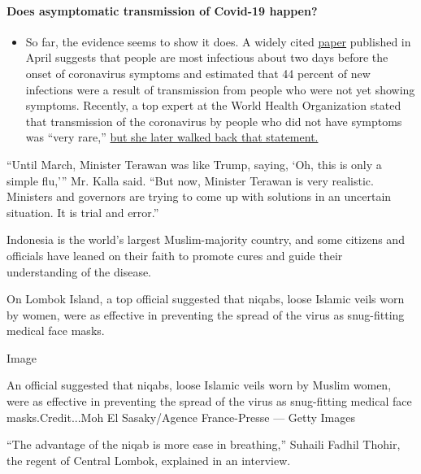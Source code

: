 \begin{itemize}
{  \paragraph{Does asymptomatic transmission of Covid-19
  happen?}\label{does-asymptomatic-transmission-of-covid-19-happen}}

  \begin{itemize}
  \tightlist
  \item
    So far, the evidence seems to show it does. A widely cited
    \href{https://www.nature.com/articles/s41591-020-0869-5}{paper}
    published in April suggests that people are most infectious about
    two days before the onset of coronavirus symptoms and estimated that
    44 percent of new infections were a result of transmission from
    people who were not yet showing symptoms. Recently, a top expert at
    the World Health Organization stated that transmission of the
    coronavirus by people who did not have symptoms was ``very rare,''
    \href{https://www.nytimes3xbfgragh.onion/2020/06/09/world/coronavirus-updates.html?action=click\&pgtype=Article\&state=default\&region=MAIN_CONTENT_3\&context=storylines_faq\#link-1f302e21}{but
    she later walked back that statement.}
  \end{itemize}
\end{itemize}

``Until March, Minister Terawan was like Trump, saying, `Oh, this is
only a simple flu,''' Mr. Kalla said. ``But now, Minister Terawan is
very realistic. Ministers and governors are trying to come up with
solutions in an uncertain situation. It is trial and error.''

Indonesia is the world's largest Muslim-majority country, and some
citizens and officials have leaned on their faith to promote cures and
guide their understanding of the disease.

On Lombok Island, a top official suggested that niqabs, loose Islamic
veils worn by women, were as effective in preventing the spread of the
virus as snug-fitting medical face masks.

Image

An official suggested that niqabs, loose Islamic veils worn by Muslim
women, were as effective in preventing the spread of the virus as
snug-fitting medical face masks.Credit...Moh El Sasaky/Agence
France-Presse --- Getty Images

``The advantage of the niqab is more ease in breathing,'' Suhaili Fadhil
Thohir, the regent of Central Lombok, explained in an interview.

